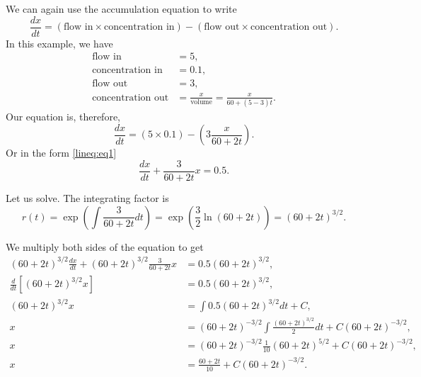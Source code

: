 \documentclass{ximera}
\begin{document}
\begin{exampleSol}
    We can again use the accumulation equation to write
    \begin{equation*}
        \frac{dx}{dt} =
        (\text{flow in} \times \text{concentration in})  - 
        (\text{flow out} \times \text{concentration out}) .
    \end{equation*}
    In this example, we have
    \begin{align*}
        \text{flow in} &= 5 , \\
        \text{concentration in} &= 0.1 , \\
        \text{flow out} &= 3 , \\
        \text{concentration out} &= \frac{x}{\text{volume}} = \frac{x}{60+(5-3)t} .
    \end{align*}
    Our equation is, therefore,
    \begin{equation*}
        \frac{dx}{dt} = (5 \times 0.1) - \left(3 \frac{x}{60+2t}\right) .
    \end{equation*}
    Or in the form \eqref{lineq:eq1}
    \begin{equation*}
        \frac{dx}{dt} + \frac{3}{60+2t} x = 0.5 .
    \end{equation*}
    
    Let us solve.  The integrating factor is
    \begin{equation*}
        r(t) = \exp \left( \int \frac{3}{60+2t} dt  \right) = \exp \left( \frac{3}{2} \ln (60+2t) \right) = {(60+2t)}^{3/2} .
    \end{equation*}
    
    We multiply both sides of the equation to get
    \begin{align*}
        {(60+2t)}^{3/2} \frac{dx}{dt} + {(60+2t)}^{3/2} \frac{3}{60+2t} x & = 0.5{(60+2t)}^{3/2} ,\\
        \frac{d}{dt}\left[ {(60+2t)}^{3/2} x \right] & = 0.5{(60+2t)}^{3/2} ,\\
        {(60+2t)}^{3/2} x & = \int  0.5{(60+2t)}^{3/2} dt +C ,\\
        x & = {(60+2t)}^{-3/2} \int \frac{ {(60+2t)}^{3/2}}{2} dt + C{(60+2t)}^{-3/2} ,\\
        x & = {(60+2t)}^{-3/2} \frac{1}{10}{(60+2t)}^{5/2} +C{(60+2t)}^{-3/2} ,\\
        x & = \frac{60+2t}{10} + C{(60+2t)}^{-3/2} .
    \end{align*}
    

\end{exampleSol}
\end{document}

